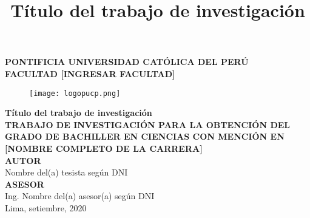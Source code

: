 \clearpage{\pagestyle{empty}\cleardoublepage}
\begin{titlepage}
\begin{center}
 {\Large \bf PONTIFICIA UNIVERSIDAD CATÓLICA DEL PERÚ}\\
  \vspace{0.8 cm} 
  {\Large \bf FACULTAD [INGRESAR FACULTAD]}\\
  \vspace{1.75 cm}
 \begin{figure}[H]
    \centering
    \texttt{[image: logopucp.png]}
\end{figure}
  \vspace{0.25cm}

\title{Título del trabajo de investigación} %
{\Large \bf Título del trabajo de investigación}\\ %
\vspace{0.5cm}
{\Large \bf TRABAJO DE INVESTIGACIÓN PARA LA OBTENCIÓN DEL GRADO DE BACHILLER EN CIENCIAS CON MENCIÓN EN [NOMBRE COMPLETO DE LA CARRERA]}\\[2.5 cm]
{\large \bf AUTOR}\\[0.5cm]
{\large Nombre del(a) tesista según DNI}\\[1.75 cm] %
{\large \bf ASESOR}\\[0.5 cm] 
{\large Ing. Nombre del(a) asesor(a) según DNI}\\[0.5 cm] %
\vspace{2.5 cm}
{\large Lima, setiembre, 2020}

\end{center}
\end{titlepage}